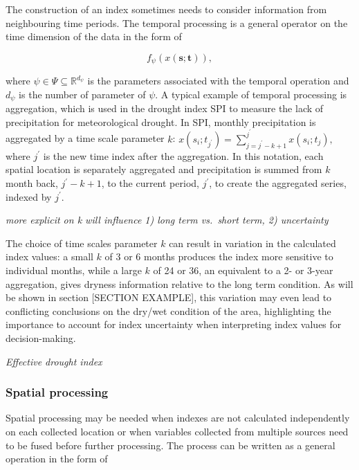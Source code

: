 \documentclass[
]{interact}
\begin{document}
The construction of an index sometimes needs to consider information
from neighbouring time periods. The temporal processing is a general
operator on the time dimension of the data in the form of

\begin{equation}
f_{\mathcal{\psi}}(x(\mathbf{s};\mathbf{t})),
\end{equation}

where \(\psi \in \Psi \subseteq \mathbb{R}^{d_{\psi}}\) is the
parameters associated with the temporal operation and \(d_{\psi}\) is
the number of parameter of \(\psi\). A typical example of temporal
processing is aggregation, which is used in the drought index SPI to
measure the lack of precipitation for meteorological drought. In SPI,
monthly precipitation is aggregated by a time scale parameter \(k\):
\(x(s_i;t_{j^\prime}) = \sum_{j = j^\prime-k+1}^{j^\prime}x(s_i; t_j),\)
where \(j^\prime\) is the new time index after the aggregation. In this
notation, each spatial location is separately aggregated and
precipitation is summed from \(k\) month back, \(j^\prime - k + 1\), to
the current period, \(j^\prime\), to create the aggregated series,
indexed by \(j^\prime\).

\emph{more explicit on k will influence 1) long term vs.~short term, 2)
uncertainty}

The choice of time scales parameter \(k\) can result in variation in the
calculated index values: a small \(k\) of 3 or 6 months produces the
index more sensitive to individual months, while a large \(k\) of 24 or
36, an equivalent to a 2- or 3-year aggregation, gives dryness
information relative to the long term condition. As will be shown in
section {[}SECTION EXAMPLE{]}, this variation may even lead to
conflicting conclusions on the dry/wet condition of the area,
highlighting the importance to account for index uncertainty when
interpreting index values for decision-making.

\emph{Effective drought index}

\hypertarget{spatial-processing}{%
\subsubsection{Spatial processing}\label{spatial-processing}}

Spatial processing may be needed when indexes are not calculated
independently on each collected location or when variables collected
from multiple sources need to be fused before further processing. The
process can be written as a general operation in the form of
\end{document}
